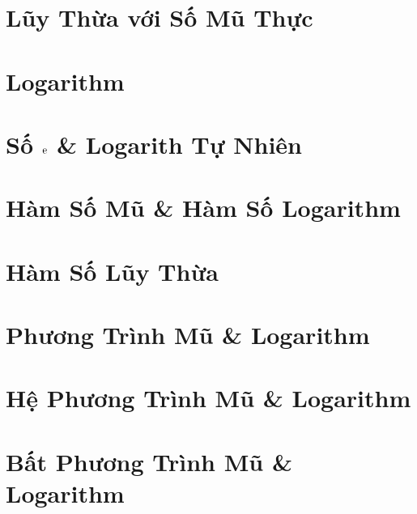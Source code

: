 \documentclass[oneside]{book}
\numberwithin{equation}{section}
\begin{document}
\section{Lũy Thừa với Số Mũ Thực}


\section{Logarithm}


\section{Số $\rm e$ \& Logarith Tự Nhiên}


\section{Hàm Số Mũ \& Hàm Số Logarithm}


\section{Hàm Số Lũy Thừa}


\section{Phương Trình Mũ \& Logarithm}


\section{Hệ Phương Trình Mũ \& Logarithm}


\section{Bất Phương Trình Mũ \& Logarithm}
\end{document}
